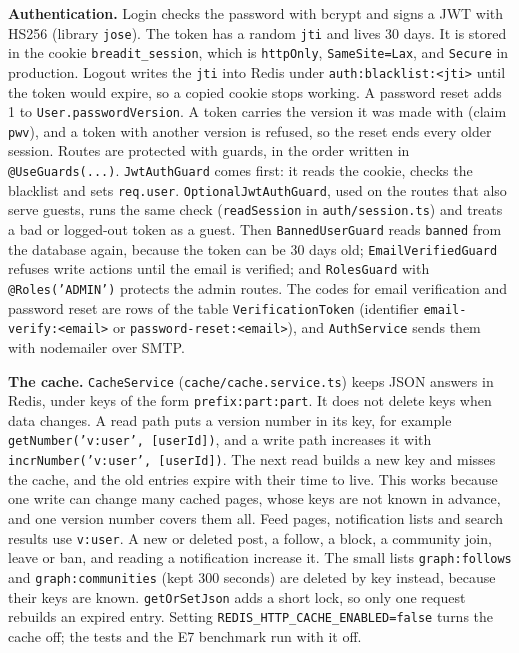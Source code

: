 \textbf{Authentication.} Login checks the password with bcrypt and signs a JWT with HS256 (library \texttt{jose}). The token has a random \texttt{jti} and lives 30 days. It is stored in the cookie \texttt{breadit\_session}, which is \texttt{httpOnly}, \texttt{SameSite=Lax}, and \texttt{Secure} in production. Logout writes the \texttt{jti} into Redis under \texttt{auth:blacklist:<jti>} until the token would expire, so a copied cookie stops working. A password reset adds 1 to \texttt{User.passwordVersion}. A token carries the version it was made with (claim \texttt{pwv}), and a token with another version is refused, so the reset ends every older session. Routes are protected with guards, in the order written in \texttt{@UseGuards(...)}. \texttt{JwtAuthGuard} comes first: it reads the cookie, checks the blacklist and sets \texttt{req.user}. \texttt{OptionalJwtAuthGuard}, used on the routes that also serve guests, runs the same check (\texttt{readSession} in \texttt{auth/session.ts}) and treats a bad or logged-out token as a guest. Then \texttt{BannedUserGuard} reads \texttt{banned} from the database again, because the token can be 30 days old; \texttt{EmailVerifiedGuard} refuses write actions until the email is verified; and \texttt{RolesGuard} with \texttt{@Roles('ADMIN')} protects the admin routes. The codes for email verification and password reset are rows of the table \texttt{VerificationToken} (identifier \texttt{email-verify:<email>} or \texttt{password-reset:<email>}), and \texttt{AuthService} sends them with nodemailer over SMTP.

\textbf{The cache.} \texttt{CacheService} (\texttt{cache/cache.service.ts}) keeps JSON answers in Redis, under keys of the form \texttt{prefix:part:part}. It does not delete keys when data changes. A read path puts a version number in its key, for example \texttt{getNumber('v:user', [userId])}, and a write path increases it with \texttt{incrNumber('v:user', [userId])}. The next read builds a new key and misses the cache, and the old entries expire with their time to live. This works because one write can change many cached pages, whose keys are not known in advance, and one version number covers them all. Feed pages, notification lists and search results use \texttt{v:user}. A new or deleted post, a follow, a block, a community join, leave or ban, and reading a notification increase it. The small lists \texttt{graph:follows} and \texttt{graph:communities} (kept 300 seconds) are deleted by key instead, because their keys are known. \texttt{getOrSetJson} adds a short lock, so only one request rebuilds an expired entry. Setting \texttt{REDIS\_HTTP\_CACHE\_ENABLED=false} turns the cache off; the tests and the E7 benchmark run with it off.

